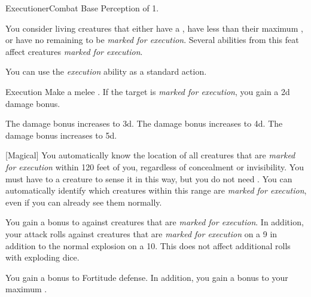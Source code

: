     \begin{feat}{Executioner}{Combat}
        \featpres Base Perception of 1.

         You consider living creatures that either have a , have less than their maximum , or have no remaining  to be \textit{marked for execution}.
        Several abilities from this feat affect creatures \textit{marked for execution}.

         You can use the \textit{execution} ability as a standard action.
        \begin{freeability}{Execution}
            Make a melee .
            If the target is \textit{marked for execution}, you gain a \plus2d damage bonus.

            \rankline
             The damage bonus increases to \plus3d.
             The damage bonus increases to \plus4d.
             The damage bonus increases to \plus5d.
        \end{freeability}

        [Magical] You automatically know the location of all creatures that are \textit{marked for execution} within 120 feet of you, regardless of concealment or invisibility.
        You must have  to a creature to sense it in this way, but you do not need .
        You can automatically identify which creatures within this range are \textit{marked for execution}, even if you can already see them normally.

         You gain a  bonus to  against creatures that are \textit{marked for execution}.
        In addition, your attack rolls against creatures that are \textit{marked for execution}  on a 9 in addition to the normal explosion on a 10.
        This does not affect additional rolls with exploding dice.

         You gain a  bonus to Fortitude defense.
        In addition, you gain a  bonus to your maximum .


\end{feat}
